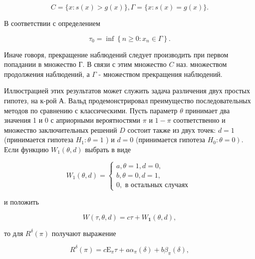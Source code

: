 \documentclass[10pt]{article}
\begin{document}
\[

C=\{x: s(x)>g(x)\}, \Gamma=\{x: s(x)=g(x)\} .

\]



В соответствии с определением



\[

\tau_{0}=\inf \left\{n \geqslant 0: x_{n} \in \Gamma\right\} .

\]



Иначе говоря, прекращение наблюдений следует производить при первом попадании в множество Г. В связи с этим множество $C$ наз. множеством продолжения наблюдений, а $\Gamma$ - множеством прекращения наблюдений.



Иллюстрацией этих результатов может служить задача различения двух простых гипотез, на к-рой А. Вальд продемонстрировал преимущество последовательных методов по сравнению с классическими. Пусть параметр $\theta$ принимает два значения 1 и 0 с априорными вероятностями $\pi$ и $1-\pi$ соответственно и множество заключительных решений $D$ состоит также из двух точек: $d=1$ (принимается гипотеза $H_{1}: \theta=1$ ) и $d=0$ (принимается гипотеза $\left.H_{0}: \theta=0\right)$. Если функцию $W_{1}(\theta, d)$ выбрать в виде



\[

W_{1}(\theta, d)=\left\{\begin{array}{l}

a, \theta=1, d=0, \\

b, \theta=0, d=1, \\

0, \text { в остальных случаях }

\end{array}\right.

\]



и положить



\[

W(\tau, \theta, d)=c \tau+W_{\mathbf{1}}(\theta, d),

\]



то для $R^{\delta}(\pi)$ получают выражение



\[

R^{\delta}(\pi)=c \mathrm{E}_{\pi} \tau+a \alpha_{\pi}(\delta)+b \beta_{\pi}(\delta),

\]
\end{document}
